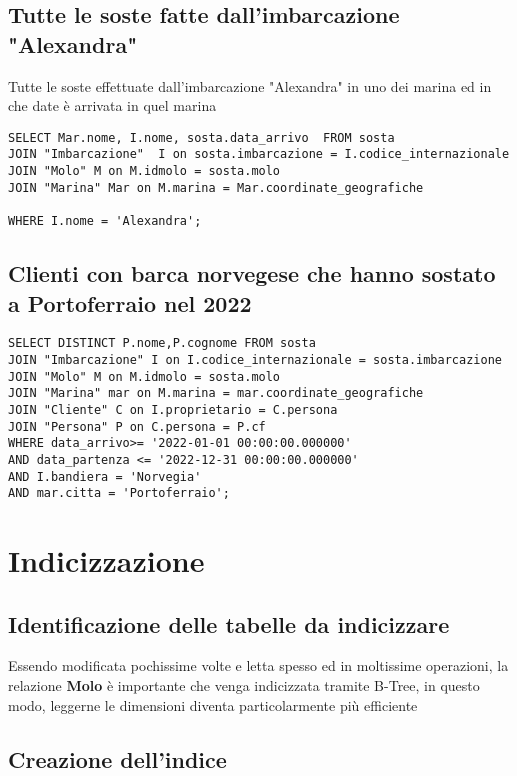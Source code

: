 \subsection{Tutte le soste fatte dall'imbarcazione "Alexandra"}

Tutte le soste effettuate dall'imbarcazione "Alexandra" in uno dei marina ed in che date è arrivata in quel marina

\begin{lstlisting}
SELECT Mar.nome, I.nome, sosta.data_arrivo  FROM sosta
JOIN "Imbarcazione"  I on sosta.imbarcazione = I.codice_internazionale
JOIN "Molo" M on M.idmolo = sosta.molo
JOIN "Marina" Mar on M.marina = Mar.coordinate_geografiche

WHERE I.nome = 'Alexandra';
\end{lstlisting}

\subsection{Clienti con barca norvegese che hanno sostato a Portoferraio nel 2022}

\begin{lstlisting}
SELECT DISTINCT P.nome,P.cognome FROM sosta
JOIN "Imbarcazione" I on I.codice_internazionale = sosta.imbarcazione
JOIN "Molo" M on M.idmolo = sosta.molo
JOIN "Marina" mar on M.marina = mar.coordinate_geografiche
JOIN "Cliente" C on I.proprietario = C.persona
JOIN "Persona" P on C.persona = P.cf
WHERE data_arrivo>= '2022-01-01 00:00:00.000000'
AND data_partenza <= '2022-12-31 00:00:00.000000'
AND I.bandiera = 'Norvegia'
AND mar.citta = 'Portoferraio';
\end{lstlisting}

\section{Indicizzazione}
\subsection{Identificazione delle tabelle da indicizzare}

Essendo modificata pochissime volte e letta spesso ed in moltissime operazioni, la relazione \textbf{Molo} è importante che venga indicizzata tramite B-Tree, in questo modo, leggerne le dimensioni diventa particolarmente più efficiente 
\subsection{Creazione dell'indice}
